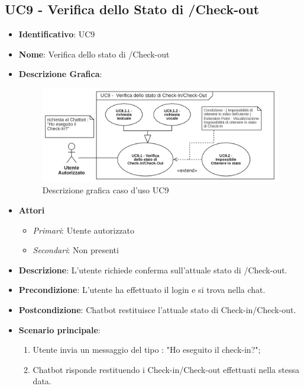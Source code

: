 \subsection{UC9 - Verifica dello Stato di /Check-out}
\begin{itemize}
	\item \textbf{Identificativo}: UC9
	\item \textbf{Nome}: Verifica dello stato di /Check-out
	\item\textbf{Descrizione Grafica}: 
	
	\begin{figure}[h]
		\centering
		\includegraphics[scale=0.60]{images/UC9.png} 
		\caption{Descrizione grafica caso d'uso UC9}
	 \end{figure}

	\item \textbf{Attori}
	\begin{itemize} 
		\item \textit{Primari}: Utente autorizzato
		\item \textit{Secondari}: Non presenti
	\end{itemize}
	\item \textbf{Descrizione}: L'utente richiede conferma sull'attuale stato di /Check-out.
	\item \textbf{Precondizione}: L'utente ha effettuato il login e si trova nella chat.
	\item \textbf{Postcondizione}: Chatbot restituisce l'attuale stato di Check-in/Check-out.
	\item \textbf{Scenario principale}:  \begin{enumerate}
		\item Utente invia un messaggio del tipo : "Ho eseguito il check-in?";
		\item Chatbot risponde restituendo i Check-in/Check-out effettuati nella stessa data.
	\end{enumerate}
\end{itemize}

